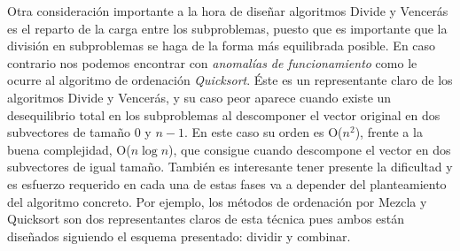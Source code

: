 Otra consideración importante a la hora de diseñar algoritmos Divide y
Vencerás es el reparto de la carga entre los subproblemas, puesto que es importante
que la división en subproblemas se haga de la forma más equilibrada posible. En
caso contrario nos podemos encontrar con \emph{anomalías de funcionamiento} como le
ocurre al algoritmo de ordenación \emph{Quicksort}. Éste es un representante claro de los
algoritmos Divide y Vencerás, y su caso peor aparece cuando existe un
desequilibrio total en los subproblemas al descomponer el vector original en dos
subvectores de tamaño $0$ y $n-1$. En este caso su
orden es O($n^2$), frente a la buena complejidad, O($n\log n$), que consigue cuando
descompone el vector en dos subvectores de igual tamaño.
También es interesante tener presente la dificultad y es esfuerzo requerido en
cada una de estas fases va a depender del planteamiento del algoritmo concreto.
Por ejemplo, los métodos de ordenación por Mezcla y Quicksort son dos
representantes claros de esta técnica pues ambos están diseñados siguiendo el
esquema presentado: dividir y combinar.